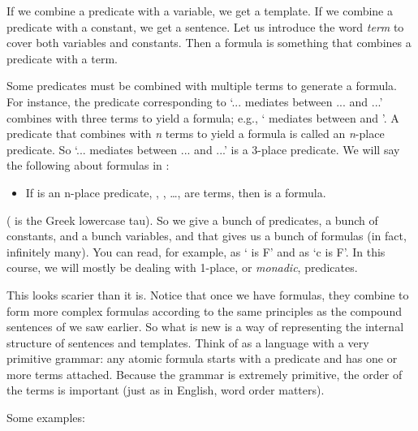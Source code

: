  If we combine a predicate with a variable, we get a template. If we combine a 
 predicate with a constant, we get a sentence. Let us introduce the word 
 \emph{term} to cover both variables and constants. Then a formula is something 
 that combines a predicate with a term.

 Some predicates must be combined with multiple terms to generate a formula.  
 For instance, the predicate corresponding to `... mediates between ... and ...' 
 combines with three terms to yield a formula; e.g., ` mediates between 
  and '. A predicate that combines with \emph{n} terms to yield a 
 formula is called an \emph{n}-place predicate. So  `... mediates between ...  
 and ...' is a 3-place predicate.  We will say the following about formulas in 
 \lL[Q]:

\begin{itemize}

 \item If  is an n-place predicate, , , 
  \ldots,  are terms, then  is 
  a formula.

\end{itemize}

(\p{\tau} is the Greek lowercase tau). So we give \lL[Q] a bunch of predicates, 
a bunch of constants, and a bunch variables, and that gives us  a bunch of 
formulas (in fact, infinitely many).
You can read, for example,  as ` is F' and  as `c is F'. In 
this course, we will mostly be dealing with 1-place, or \emph{monadic}, 
predicates.

This looks scarier than it is. Notice that once we have formulas, they combine 
to form more complex formulas according to  the same principles as the compound 
sentences of \lL{} we saw earlier. So what is new is a way of representing the 
internal structure of sentences and templates. Think of \lL[Q]{} as a language 
with a very primitive grammar: any atomic formula starts with a predicate and 
has one or more terms attached.  Because the grammar is extremely primitive, the 
order of the terms is important (just as in English, word order matters).

Some examples:  

